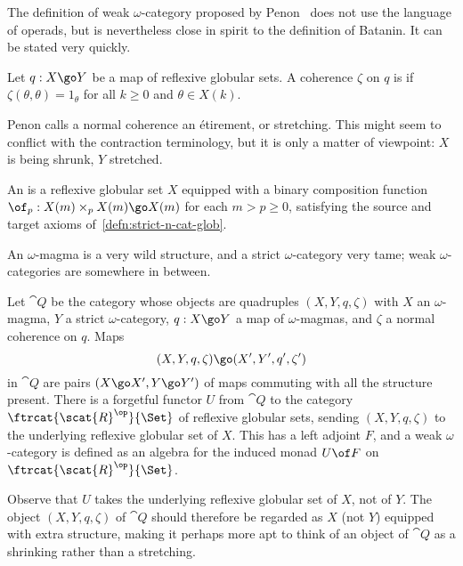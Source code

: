%
%
%
%
%


The definition of weak $\omega$-category proposed by Penon~\cite{Pen} does
not use the language of operads, but is nevertheless close in spirit to the
definition of Batanin.  It can be stated very quickly.

\begin{defn}
Let $q: X \go Y$ be a map of reflexive globular sets.  A coherence $\zeta$
on $q$ is %
%
%
%
%
if $\zeta(\theta, \theta) = 1_\theta$ for all
$k\geq 0$ and $\theta\in X(k)$.
\end{defn}
%
Penon calls a normal coherence an \'etirement,%
%
%
or stretching.%
%
%
This might
seem to conflict with the contraction terminology, but it is only a matter
of viewpoint: $X$ is being shrunk, $Y$ stretched.

\begin{defn}
An %
%
%
%
%
is a reflexive globular set $X$ equipped with a
binary composition function $\of_p: X(m) \times_p X(m) \go X(m)$ for each
$m > p \geq 0$, satisfying the source and target axioms
of~\ref{defn:strict-n-cat-glob}.
\end{defn}
%
An $\omega$-magma is a very wild structure, and a strict $\omega$-category
very tame; weak $\omega$-categories are somewhere in between.  

Let $\cat{Q}$ be the category whose objects are quadruples $(X, Y, q,
\zeta)$ with $X$ an $\omega$-magma, $Y$ a strict $\omega$-category, $q: X
\go Y$ a map of $\omega$-magmas, and $\zeta$ a normal coherence on $q$.
Maps
\[
(X, Y, q, \zeta) \go (X', Y', q', \zeta')
\]
in $\cat{Q}$ are pairs $(X \go X', Y \go Y')$ of maps commuting with all
the structure present.  There is a forgetful functor $U$ from $\cat{Q}$ to
the category $\ftrcat{\scat{R}^\op}{\Set}$ of reflexive globular sets,
sending $(X, Y, q, \zeta)$ to the underlying reflexive globular set of $X$.
This has a left adjoint $F$, and a weak $\omega$-category is
defined as an algebra for the induced monad $U\of F$ on
$\ftrcat{\scat{R}^\op}{\Set}$.

Observe that $U$ takes the underlying reflexive globular set of $X$, not of
$Y$.  The object $(X, Y, q, \zeta)$ of $\cat{Q}$ should therefore be
regarded as $X$ (not $Y$) equipped with extra structure, making it perhaps
more apt to think of an object of $\cat{Q}$ as a shrinking rather than a
stretching.

